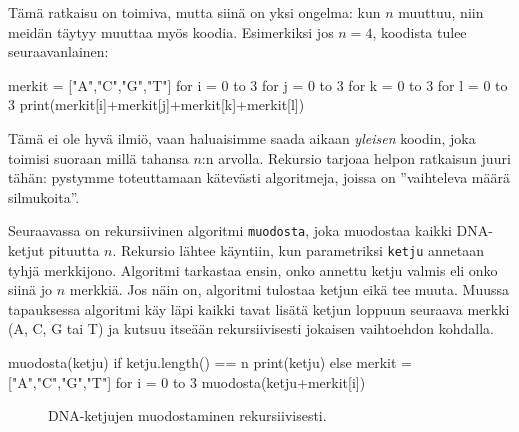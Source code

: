 Tämä ratkaisu on toimiva, mutta siinä on yksi ongelma:
kun $n$ muuttuu, niin meidän täytyy muuttaa myös koodia.
Esimerkiksi jos $n=4$, koodista tulee seuraavanlainen:

\begin{code}
merkit = ["A","C","G","T"]
for i = 0 to 3
    for j = 0 to 3
        for k = 0 to 3
            for l = 0 to 3
                print(merkit[i]+merkit[j]+merkit[k]+merkit[l])
\end{code}

Tämä ei ole hyvä ilmiö, vaan haluaisimme saada aikaan \emph{yleisen}
koodin, joka toimisi suoraan millä tahansa $n$:n arvolla.
Rekursio tarjoaa helpon ratkaisun juuri tähän:
pystymme toteuttamaan kätevästi algoritmeja, joissa on
''vaihteleva määrä silmukoita''.

Seuraavassa on rekursiivinen algoritmi \texttt{muodosta},
joka muodostaa kaikki DNA-ketjut pituutta $n$.
Rekursio lähtee käyntiin, kun parametriksi \texttt{ketju}
annetaan tyhjä merkkijono.
Algoritmi tarkastaa ensin, onko annettu ketju valmis
eli onko siinä jo $n$ merkkiä.
Jos näin on, algoritmi tulostaa ketjun eikä tee muuta.
Muussa tapauksessa algoritmi käy läpi kaikki tavat
lisätä ketjun loppuun seuraava merkki (A, C, G tai T)
ja kutsuu itseään rekursiivisesti jokaisen vaihtoehdon kohdalla.

\begin{code}
muodosta(ketju)
    if ketju.length() == n
        print(ketju)
    else
        merkit = ["A","C","G","T"]
        for i = 0 to 3
            muodosta(ketju+merkit[i])
\end{code}

\begin{figure}
\center
{}
\caption{DNA-ketjujen muodostaminen rekursiivisesti.}
\label{fig:ketjut}
\end{figure}

